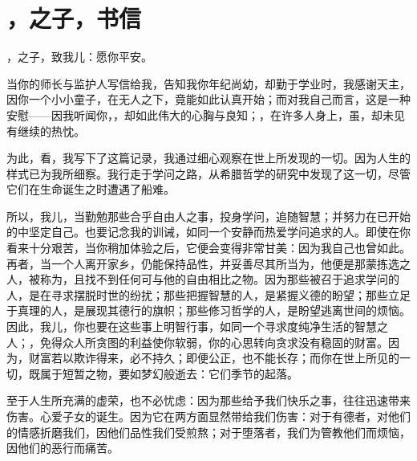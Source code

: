 
\chapter{，之子，书信}


，之子，致我儿：愿你平安。\par

当你的师长与监护人写信给我，告知我你年纪尚幼，却勤于学业时，我感谢天主，因你一个小小童子，在无人之下，竟能如此认真开始；而对我自己而言，这是一种安慰——因我听闻你，，却如此伟大的心胸与良知；，在许多人身上，虽，却未见有继续的热忱。\par

为此，看，我写下了这篇记录，我通过细心观察在世上所发现的一切。因为人生的样式已为我所细察。我行走于学问之路，从希腊哲学的研究中发现了这一切，尽管它们在生命诞生之时遭遇了船难。\par

所以，我儿，当勤勉那些合乎自由人之事，投身学问，追随智慧；并努力在已开始的中坚定自己。也要记念我的训诫，如同一个安静而热爱学问追求的人。即使在你看来十分艰苦，当你稍加体验之后，它便会变得非常甘美：因为我自己也曾如此。再者，当一个人离开家乡，仍能保持品性，并妥善尽其所当为，他便是那蒙拣选之人，被称为，且找不到任何可与他的自由相比之物。因为那些被召于追求学问的人，是在寻求摆脱时世的纷扰；那些把握智慧的人，是紧握义德的盼望；那些立足于真理的人，是展现其德行的旗帜；那些修习哲学的人，是盼望逃离世间的烦恼。因此，我儿，你也要在这些事上明智行事，如同一个寻求度纯净生活的智慧之人；，免得众人所贪图的利益使你软弱，你的心思转向贪求没有稳固的财富。因为，财富若以欺诈得来，必不持久；即便公正，也不能长存；而你在世上所见的一切，既属于短暂之物，要如梦幻般逝去：它们季节的起落。\par

至于人生所充满的虚荣，也不必忧虑：因为那些给予我们快乐之事，往往迅速带来伤害。心爱子女的诞生。因为它在两方面显然带给我们伤害：对于有德者，对他们的情感折磨我们，因他们品性我们受煎熬；对于堕落者，我们为管教他们而烦恼，因他们的恶行而痛苦。\par

